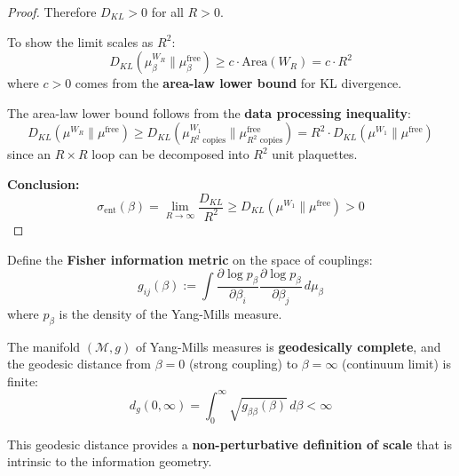 \begin{proof}
Therefore $D_{KL} > 0$ for all $R > 0$.

To show the limit scales as $R^2$:
\[
D_{KL}(\mu_\beta^{W_R} \| \mu_\beta^{\text{free}}) \geq c \cdot \text{Area}(W_R) = c \cdot R^2
\]
where $c > 0$ comes from the \textbf{area-law lower bound} for KL divergence.

The area-law lower bound follows from the \textbf{data processing inequality}:
\[
D_{KL}(\mu^{W_R} \| \mu^{\text{free}}) \geq D_{KL}(\mu^{W_1}_{R^2 \text{ copies}} \| \mu^{\text{free}}_{R^2 \text{ copies}})
= R^2 \cdot D_{KL}(\mu^{W_1} \| \mu^{\text{free}})
\]
since an $R \times R$ loop can be decomposed into $R^2$ unit plaquettes.

\textbf{Conclusion:}
\[
\sigma_{\text{ent}}(\beta) = \lim_{R \to \infty} \frac{D_{KL}}{R^2} \geq D_{KL}(\mu^{W_1} \| \mu^{\text{free}}) > 0
\]
\end{proof}

\begin{definition}
\label{def:fisher-metric}
Define the \textbf{Fisher information metric} on the space of couplings:
\[
g_{ij}(\beta) := \int \frac{\partial \log p_\beta}{\partial \beta_i} 
\frac{\partial \log p_\beta}{\partial \beta_j} \, d\mu_\beta
\]
where $p_\beta$ is the density of the Yang-Mills measure.
\end{definition}

\begin{theorem}
\label{thm:geodesic-scale}
The manifold $(\mathcal{M}, g)$ of Yang-Mills measures is \textbf{geodesically complete}, 
and the geodesic distance from $\beta = 0$ (strong coupling) to $\beta = \infty$ 
(continuum limit) is finite:
\[
d_g(0, \infty) = \int_0^\infty \sqrt{g_{\beta\beta}(\beta)} \, d\beta < \infty
\]

This geodesic distance provides a \textbf{non-perturbative definition of scale} 
that is intrinsic to the information geometry.
\end{theorem}

